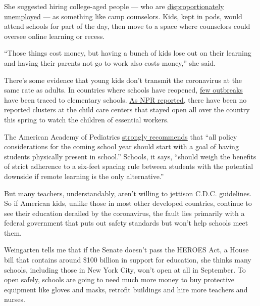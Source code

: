 She suggested hiring college-aged people --- who are
\href{http://pewresearch.org/fact-tank/2020/06/11/unemployment-rose-higher-in-three-months-of-covid-19-than-it-did-in-two-years-of-the-great-recession/}{disproportionately
unemployed} --- as something like camp counselors. Kids, kept in pods,
would attend schools for part of the day, then move to a space where
counselors could oversee online learning or recess.

``Those things cost money, but having a bunch of kids lose out on their
learning and having their parents not go to work also costs money,'' she
said.

There's some evidence that young kids don't transmit the coronavirus at
the same rate as adults. In countries where schools have reopened,
\href{https://www.wired.com/story/its-ridiculous-to-treat-schools-like-covid-hot-zones/}{few
outbreaks} have been traced to elementary schools.
\href{https://www.npr.org/2020/06/24/882316641/what-parents-can-learn-from-child-care-centers-that-stayed-open-during-lockdowns}{As
NPR reported}, there have been no reported clusters at the child care
centers that stayed open all over the country this spring to watch the
children of essential workers.

The American Academy of Pediatrics
\href{https://services.aap.org/en/pages/2019-novel-coronavirus-covid-19-infections/clinical-guidance/covid-19-planning-considerations-return-to-in-person-education-in-schools/}{strongly
recommends} that ``all policy considerations for the coming school year
should start with a goal of having students physically present in
school.'' Schools, it says, ``should weigh the benefits of strict
adherence to a six-feet spacing rule between students with the potential
downside if remote learning is the only alternative.''

But many teachers, understandably, aren't willing to jettison C.D.C.
guidelines. So if American kids, unlike those in most other developed
countries, continue to see their education derailed by the coronavirus,
the fault lies primarily with a federal government that puts out safety
standards but won't help schools meet them.

Weingarten tells me that if the Senate doesn't pass the HEROES Act, a
House bill that contains around \$100 billion in support for education,
she thinks many schools, including those in New York City, won't open at
all in September. To open safely, schools are going to need much more
money to buy protective equipment like gloves and masks, retrofit
buildings and hire more teachers and nurses.

